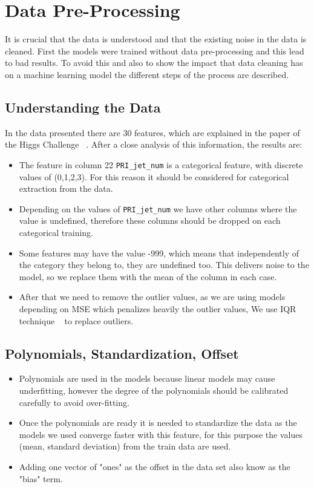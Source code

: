 \documentclass[10pt,conference,compsocconf]{IEEEtran}
\begin{document}
\section{Data Pre-Processing}

\label{sec:Data Pre-Processing}

It is crucial that the data is understood and that the existing noise in the 
data is cleaned. First the models were trained without data pre-processing
and this lead to bad results. To avoid this and also to 
show the impact that data cleaning has on a machine learning model the different
steps of the process are described.

\subsection{Understanding the Data}
In the data presented there are 30 features, which are explained in 
the paper of the Higgs Challenge ~\cite{higgs_challenge01}. After a 
close analysis of this information, the results are:

\begin{itemize}
 \label{text:categorical}
\item The feature in column 22 \texttt{PRI\_jet\_num} is a categorical feature,
with discrete values of (0,1,2,3). For this reason it should be considered
for categorical extraction from the data.
\item Depending on the values of \texttt{PRI\_jet\_num}  we have other columns
where the value is undefined, therefore these columns should be dropped 
on each categorical training.
\item Some features may have the value -999, which means that
independently of the category they belong to, they are
undefined too. This delivers
noise to the model, so we replace them with the mean of the column in each
case.
\item After that we need to remove the outlier values, as we are using models
depending on MSE which penalizes heavily the outlier values, We use IQR technique ~\cite{IQR01} to replace outliers.

\end{itemize}

\subsection{Polynomials, Standardization, Offset}
 \label{text:datasteps}
\begin{itemize}
\item Polynomials are used in the models because linear models may cause
underfitting, however the degree of the polynomials should be calibrated carefully
to avoid over-fitting.
\item Once the polynomials are ready it is needed to standardize the data 
as the models we used converge faster with this feature, for this purpose 
the values (mean, standard deviation) from the train data are used.
\item Adding one vector of "ones" as the offset in the data set also know as the
"bias" term.

\end{itemize}
\end{document}
